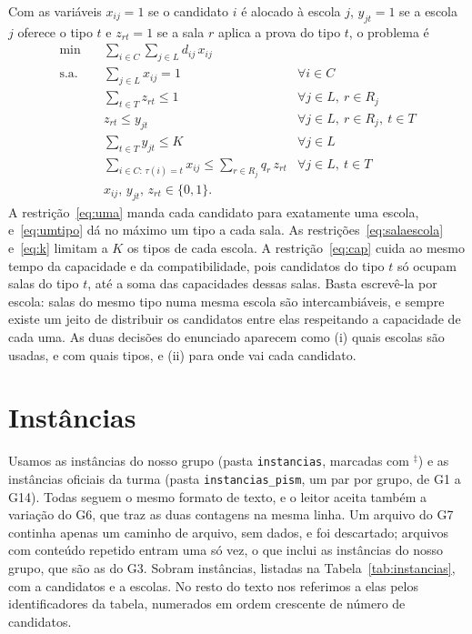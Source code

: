 \documentclass[12pt]{article}
\begin{document}
Com as variáveis $x_{ij} = 1$ se o candidato $i$ é alocado à escola $j$, $y_{jt} = 1$ se a escola
$j$ oferece o tipo $t$ e $z_{rt} = 1$ se a sala $r$ aplica a prova do tipo $t$, o problema é
\begin{align}
  \min \quad & \sum_{i \in C} \sum_{j \in L} d_{ij}\, x_{ij} \label{eq:obj}\\
  \text{s.a.}\quad & \sum_{j \in L} x_{ij} = 1 & \forall i \in C \label{eq:uma}\\
  & \sum_{t \in T} z_{rt} \le 1 & \forall j \in L,\ r \in R_j \label{eq:umtipo}\\
  & z_{rt} \le y_{jt} & \forall j \in L,\ r \in R_j,\ t \in T \label{eq:salaescola}\\
  & \sum_{t \in T} y_{jt} \le K & \forall j \in L \label{eq:k}\\
  & \sum_{i \in C:\, \tau(i) = t} x_{ij} \le \sum_{r \in R_j} q_r\, z_{rt} & \forall j \in L,\ t \in T
    \label{eq:cap}\\
  & x_{ij},\, y_{jt},\, z_{rt} \in \{0, 1\}.
\end{align}
A restrição~\eqref{eq:uma} manda cada candidato para exatamente uma escola, e~\eqref{eq:umtipo} dá
no máximo um tipo a cada sala. As restrições~\eqref{eq:salaescola} e~\eqref{eq:k} limitam a $K$ os
tipos de cada escola. A restrição~\eqref{eq:cap} cuida ao mesmo tempo da capacidade e da
compatibilidade, pois candidatos do tipo $t$ só ocupam salas do tipo $t$, até a soma das
capacidades dessas salas. Basta escrevê-la por escola: salas do mesmo tipo numa mesma escola são
intercambiáveis, e sempre existe um jeito de distribuir os candidatos entre elas respeitando a
capacidade de cada uma. As duas decisões do enunciado aparecem como (i) quais escolas são usadas, e
com quais tipos, e (ii) para onde vai cada candidato.

\section{Instâncias}\label{sec:instancias}

Usamos as instâncias do nosso grupo (pasta \texttt{instancias}, marcadas com $^\ddagger$) e as
instâncias oficiais da turma (pasta \texttt{instancias\_pism}, um par por grupo, de G1 a G14).
Todas seguem o mesmo formato de texto, e o leitor aceita também a variação do G6, que traz as duas
contagens na mesma linha. Um arquivo do G7 continha apenas um caminho de arquivo, sem dados, e foi
descartado; arquivos com conteúdo repetido entram uma só vez, o que inclui as instâncias do nosso
grupo, que são as do G3. Sobram \nTotal{} instâncias, listadas na Tabela~\ref{tab:instancias}, com
\Mmin{} a \Mmax{} candidatos e \Nmin{} a \Nmax{} escolas. No resto do texto nos referimos a elas
pelos identificadores da tabela, numerados em ordem crescente de número de candidatos.
\end{document}
